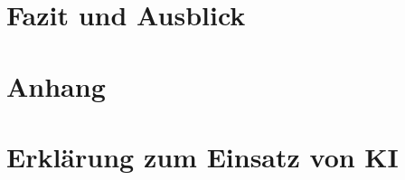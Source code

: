 \documentclass[12pt,a4paper,twoside,openright]{report}
\begin{document}
	\chapter{Fazit und Ausblick}
	\label{chap:conclusion}
	

	\printbibliography[
		heading=bibintoc,
		title={Literaturverzeichnis}
	]

	\clearpage
%
	\appendix
	\chapter{Anhang}
	\label{chap:anhang}
	

	\chapter{Erklärung zum Einsatz von KI}
	\label{app:ki-nutzung}
	

	
\end{document}
